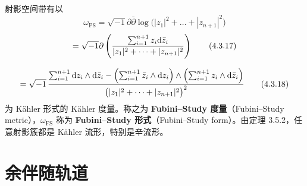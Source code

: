 射影空间带有以
\begin{equation}
  \omega_{\mathrm{FS}} = \sqrt{-1}\partial\bar\partial\log\bigl(|z_1|^2+\dots+|z_{n+1}|^2\bigr)
  \tag{4.3.16}
\end{equation}
\begin{equation}
  = \sqrt{-1}\partial\left(\frac{\sum_{i=1}^{n+1}z_i\mathrm{d}\bar z_i}{|z_1|^2+\dots+|z_{n+1}|^2}\right)
  \tag{4.3.17}
\end{equation}

\begin{equation}
  = \sqrt{-1}\,\frac{\sum_{i=1}^{n+1}\mathrm{d} z_i\wedge\mathrm{d}\bar z_i
    -\Bigl(\sum_{i=1}^{n+1}\bar z_i\wedge\mathrm{d} z_i\Bigr)\wedge
    \Bigl(\sum_{i=1}^{n+1}z_i\wedge\mathrm{d}\bar z_i\Bigr)}
    {\bigl(|z_1|^2+\dots+|z_{n+1}|^2\bigr)^2}
  \tag{4.3.18}
\end{equation}
为 Kähler 形式的 Kähler 度量。称之为 \textbf{Fubini--Study 度量}（Fubini--Study metric），$\omega_{\mathrm{FS}}$ 称为 \textbf{Fubini--Study 形式}（Fubini--Study form）。由定理 3.5.2，任意射影簇都是 Kähler 流形，特别是辛流形。




\section{余伴随轨道}


